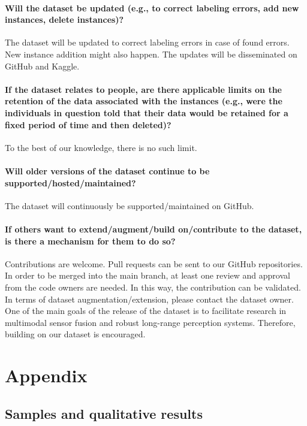 \documentclass{article}
\begin{document}
\paragraph{Will the dataset be updated (e.g., to correct labeling errors, add new instances, delete instances)?} The dataset will be updated to correct labeling errors in case of found errors. New instance addition might also happen. The updates will be disseminated on GitHub and Kaggle.

\paragraph{If the dataset relates to people, are there applicable limits on the retention of the data associated with the instances (e.g., were the individuals in question told that their data would be retained for
a fixed period of time and then deleted)?} To the best of our knowledge, there is no such limit.

\paragraph{Will older versions of the dataset continue to be supported/hosted/maintained?} The dataset will continuously be supported/maintained on GitHub.


\paragraph{If others want to extend/augment/build on/contribute to the dataset, is there a mechanism for them to do so?} Contributions are welcome. Pull requests can be sent to our GitHub repositories. In order to be merged into the main branch, at least one review and approval from the code owners are needed. In this way, the contribution can be validated. In terms of dataset augmentation/extension, please contact the dataset owner. One of the main goals of the release of the dataset is to facilitate research in multimodal sensor fusion and robust long-range perception systems. Therefore, building on our dataset is encouraged.

\newpage

\appendix

\section{Appendix}

\subsection{Samples and qualitative results}
\end{document}
